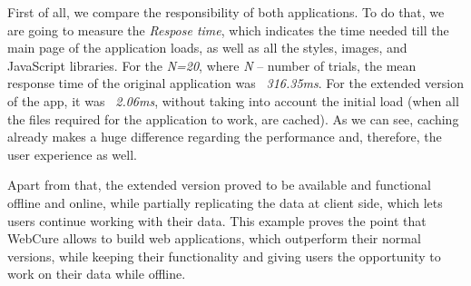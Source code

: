 First of all, we compare the responsibility of both applications. To do that, we are going to measure the \textit{Respose time}, which indicates the time needed till the main page of the application loads, as well as all the styles, images, and JavaScript libraries. For the \textit{N=20}, where \textit{N} -- number of trials, the mean response time of the original application was \textit{~316.35ms}. For the extended version of the app, it was \textit{~2.06ms}, without taking into account the initial load (when all the files required for the application to work, are cached). As we can see, caching already makes a huge difference regarding the performance and, therefore, the user experience as well. 

Apart from that, the extended version proved to be available and functional offline and online, while partially replicating the data at client side, which lets users continue working with their data. This example proves the point that WebCure allows to build web applications, which outperform their normal versions, while keeping their functionality and giving users the opportunity to work on their data while offline.

